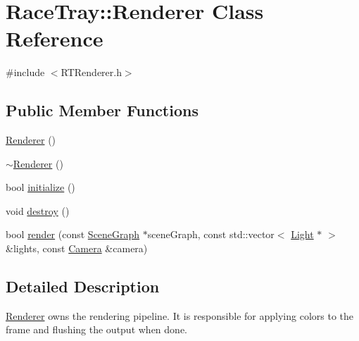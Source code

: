 \hypertarget{class_race_tray_1_1_renderer}{\section{Race\-Tray\-:\-:Renderer Class Reference}
\label{class_race_tray_1_1_renderer}
}


{\ttfamily \#include $<$R\-T\-Renderer.\-h$>$}

\subsection*{Public Member Functions}
\begin{DoxyCompactItemize}
\item 
\hyperlink{class_race_tray_1_1_renderer_a83cc3c485a1ccaab2148f93698e52398}{Renderer} ()
\item 
\hyperlink{class_race_tray_1_1_renderer_a4569bede271aef7ed70e0b99018ef721}{$\sim$\-Renderer} ()
\item 
bool \hyperlink{class_race_tray_1_1_renderer_ac74c0a08970ff3c28a6c0c333ceeb7e2}{initialize} ()
\item 
void \hyperlink{class_race_tray_1_1_renderer_ae69c470e128ab281c1ce947ba9f2a77f}{destroy} ()
\item 
bool \hyperlink{class_race_tray_1_1_renderer_a8538367f6ab111b44089376de2dfeadb}{render} (const \hyperlink{class_race_tray_1_1_scene_graph}{Scene\-Graph} $\ast$scene\-Graph, const std\-::vector$<$ \hyperlink{class_race_tray_1_1_light}{Light} $\ast$ $>$ \&lights, const \hyperlink{class_race_tray_1_1_camera}{Camera} \&camera)
\end{DoxyCompactItemize}


\subsection{Detailed Description}
\hyperlink{class_race_tray_1_1_renderer}{Renderer} owns the rendering pipeline. It is responsible for applying colors to the frame and flushing the output when done. 

